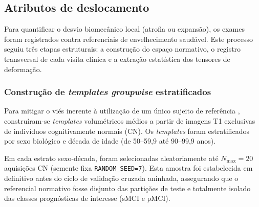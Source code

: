 \documentclass[review]{elsarticle}
\newcommand{\code}[1]{\texttt{#1}}
\begin{document}

\subsection{Atributos de deslocamento}
Para quantificar o desvio biomecânico local (atrofia ou expansão), os exames foram registrados contra referenciais de envelhecimento saudável. Este processo seguiu três etapas estruturais: a construção do espaço normativo, o registro transversal de cada visita clínica e a extração estatística dos tensores de deformação.

\subsubsection{Construção de \emph{templates groupwise} estratificados}\label{sec:groupwise}
Para mitigar o viés inerente à utilização de um único sujeito de referência \cite{reuter-2012}, construíram-se \emph{templates} volumétricos médios a partir de imagens T1 exclusivas de indivíduos cognitivamente normais (CN). Os \emph{templates} foram estratificados por sexo biológico e década de idade (de 50--59,9 até 90--99,9 anos).

Em cada estrato sexo-década, foram selecionadas aleatoriamente até $N_{\max}=20$ aquisições CN (semente fixa \code{RANDOM\_SEED=7}). Esta amostra foi estabelecida em definitivo antes do ciclo de validação cruzada aninhada, assegurando que o referencial normativo fosse disjunto das partições de teste e totalmente isolado das classes prognósticas de interesse (sMCI e pMCI).
\end{document}
